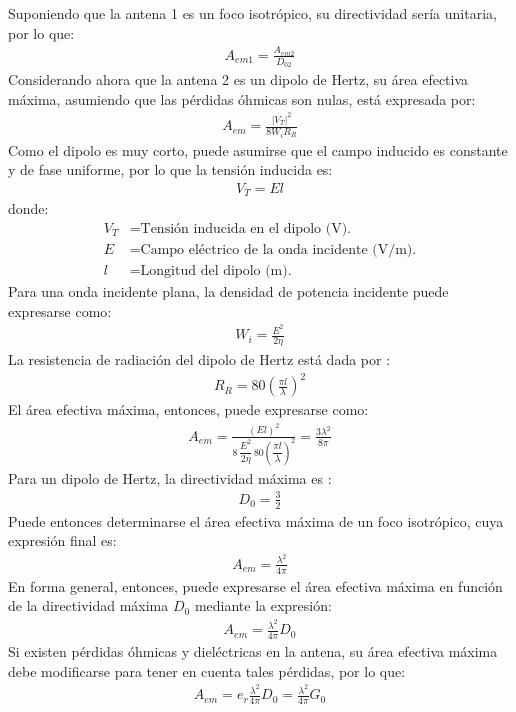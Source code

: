 Suponiendo que la antena 1 es un foco isotrópico, su directividad sería unitaria, por lo que:
\begin{align}
A_{em1} = \frac{A_{em2}}{D_{02}}
\label{ec_intro:61}
\end{align}
Considerando ahora que la antena 2 es un dipolo de Hertz, su área efectiva máxima, asumiendo que las pérdidas óhmicas son nulas, está expresada por:
\begin{align}
A_{em} = \frac{\left|V_T\right|^2}{8W_iR_R}
\label{ec_intro:62}
\end{align}
Como el dipolo es muy corto, puede asumirse que el campo inducido es constante y de fase uniforme, por lo que la tensión inducida es:
\begin{align}
V_T = El
\label{ec_intro:63}
\end{align}
donde:
\begin{align*}
V_T &= \text{Tensión inducida en el dipolo (V).}\\
E &= \text{Campo eléctrico de la onda incidente (V/m).}\\
l &= \text{Longitud del dipolo (m).}
\end{align*}
Para una onda incidente plana, la densidad de potencia incidente puede expresarse como:
\begin{align}
W_i = \frac{E^2}{2\eta}
\label{ec_intro:64}
\end{align}
La resistencia de radiación del dipolo de Hertz está dada por \cite{Fano2}:
\begin{align}
R_R = 80\left(\frac{\pi l}{\lambda}\right)^2
\label{ec_intro:65}
\end{align}
El área efectiva máxima, entonces, puede expresarse como:
\begin{align}
A_{em} = \frac{\left(El\right)^2}{8\,\dfrac{E^2}{2\eta}\,80\left(\dfrac{\pi l}{\lambda}\right)^2} = \frac{3\lambda^2}{8\pi}
\label{ec_intro:66}
\end{align}
Para un dipolo de Hertz, la directividad máxima es \cite{Fano2}:
\begin{align}
D_0 = \frac{3}{2}
\label{ec_intro:67}
\end{align}
Puede entonces determinarse el área efectiva máxima de un foco isotrópico, cuya expresión final es:
\begin{align}
A_{em} = \frac{\lambda^2}{4\pi}
\label{ec_intro:68}
\end{align}
En forma general, entonces, puede expresarse el área efectiva máxima en función de la directividad máxima $D_0$ mediante la expresión:
\begin{align}
A_{em} = \frac{\lambda^2}{4\pi}D_0
\label{ec_intro:69}
\end{align}
Si existen pérdidas óhmicas y dieléctricas en la antena, su área efectiva máxima debe modificarse para tener en cuenta tales pérdidas, por lo que:
\begin{align}
A_{em} = e_r\frac{\lambda^2}{4\pi}D_0 = \frac{\lambda^2}{4\pi}G_0
\label{ec_intro:70}
\end{align}

